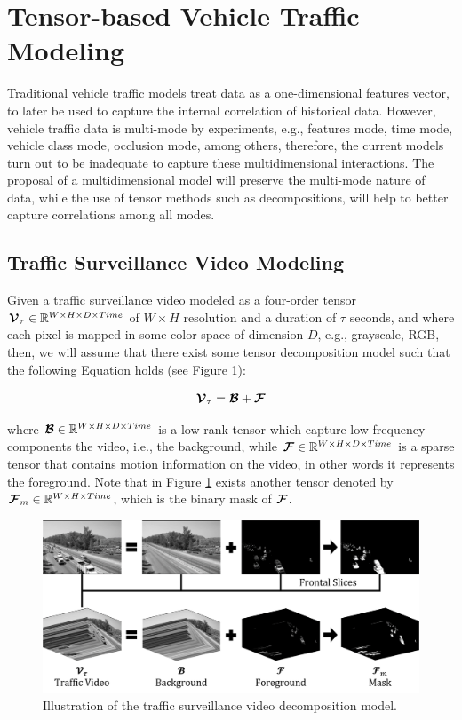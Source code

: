\documentclass[sensors,article,submit,moreauthors,pdftex]{Definitions/mdpi}
\newcommand{\mathten}[1]{\boldsymbol{\mathbf{\mathcal{\MakeUppercase{#1}}}}}
\begin{document}
\section{Tensor-based Vehicle Traffic Modeling}
Traditional vehicle traffic models treat data as a one-dimensional features vector, to later be used to capture the internal correlation of historical data. However, vehicle traffic data is multi-mode by experiments, e.g., features mode, time mode, vehicle class mode, occlusion mode, among others, therefore, the current models turn out to be inadequate to capture these multidimensional interactions. The proposal of a multidimensional model will preserve the multi-mode nature of data, while the use of tensor methods such as decompositions, will help to better capture correlations among all modes.

\subsection{Traffic Surveillance Video Modeling}

Given a traffic surveillance video modeled as a four-order tensor $\mathten{V}_\tau \in \mathbb{R}^{W\times H \times D \times Time}$ of $W \times H$ resolution and a duration of $\tau$ seconds, and where each pixel is mapped in some color-space of dimension $D$, e.g., grayscale, RGB, then, we will assume that there exist some tensor decomposition model such that the following Equation holds (see Figure \ref{fig:tsvmodel}):

\begin{equation}
\mathten{V}_\tau = \mathten{B} + \mathten{F}
\label{eq:tsvmodel}
\end{equation}

where $\mathten{B} \in \mathbb{R}^{W\times H \times D \times Time}$ is a low-rank tensor which capture low-frequency components the video, i.e., the background, while $\mathten{F} \in \mathbb{R}^{W\times H \times D \times Time}$ is a sparse tensor that contains motion information on the video, in other words it represents the foreground. Note that in Figure \ref{fig:tsvmodel} exists another tensor denoted by $\mathten{F}_m \in \mathbb{R}^{W\times H \times Time}$, which is the binary mask of $\mathten{F}$.

\begin{figure}[H]
\centering
\includegraphics[width=14 cm]{images/traffic-model.png}
\caption{Illustration of the traffic surveillance video decomposition model.}
\label{fig:tsvmodel}
\end{figure}
\end{document}
